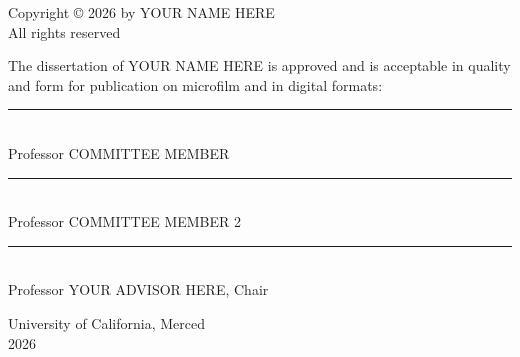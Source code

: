 \documentclass[12pt, oneside]{report}
\begin{document}
\clearpage

\newpage
\thispagestyle{empty} %
\vspace*{\fill} %

\begin{center}
    \singlespacing
    Copyright © 2026 by YOUR NAME HERE\\
    All rights reserved
\end{center}
\vspace{0.5in} %
\clearpage

\newpage
{}
\thispagestyle{plain} %
\setcounter{page}{3}  %

\begin{singlespacing}
\vspace*{\fill} %

\noindent The dissertation of YOUR NAME HERE is approved and is acceptable in quality and form for publication on microfilm and in digital formats:

\vspace{0.6in} %
  \noindent\rule{3in}{0.4pt} \\
\tagstructend 
Professor COMMITTEE MEMBER

\vspace{0.6in} %
  \noindent\rule{3in}{0.4pt} \\
\tagstructend 
Professor COMMITTEE MEMBER 2

\vspace{0.6in} %
  \noindent\rule{3in}{0.4pt} \\
\tagstructend 
Professor YOUR ADVISOR HERE, Chair %

\vspace{0.8in}

\begin{center}
    University of California, Merced \\
    2026
\end{center}

\vspace*{\fill} %
\end{singlespacing}
\clearpage
\end{document}
